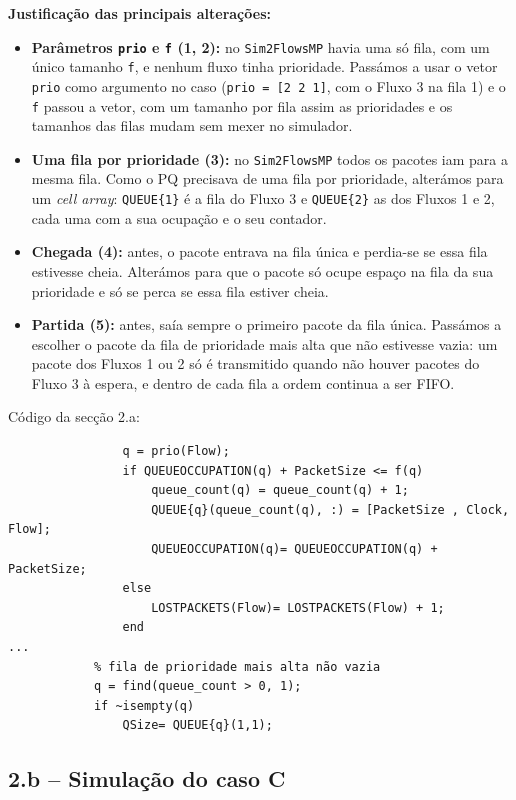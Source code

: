 \documentclass[11pt,a4paper]{article}
\newcommand{\code}[1]{\texttt{#1}}
\begin{document}
\textbf{Justificação das principais alterações:}
\begin{itemize}
  \item \textbf{Parâmetros \code{prio} e \code{f} (1, 2):} no \code{Sim2FlowsMP} havia uma só fila, com um único tamanho \code{f}, e nenhum fluxo tinha prioridade. Passámos a usar o vetor \code{prio} como argumento no caso (\code{prio = [2 2 1]}, com o Fluxo 3 na fila 1) e o \code{f} passou a vetor, com um tamanho por fila assim as prioridades e os tamanhos das filas mudam sem mexer no simulador.
  \item \textbf{Uma fila por prioridade (3):} no \code{Sim2FlowsMP} todos os pacotes iam para a mesma fila. Como o PQ precisava de uma fila por prioridade, alterámos para um \textit{cell array}: \code{QUEUE\{1\}} é a fila do Fluxo 3 e \code{QUEUE\{2\}} as dos Fluxos 1 e 2, cada uma com a sua ocupação e o seu contador.
  \item \textbf{Chegada (4):} antes, o pacote entrava na fila única e perdia-se se essa fila estivesse cheia. Alterámos para que o pacote só ocupe espaço na fila da sua prioridade e só se perca se essa fila estiver cheia.
  \item \textbf{Partida (5):} antes, saía sempre o primeiro pacote da fila única. Passámos a escolher o pacote da fila de prioridade mais alta que não estivesse vazia: um pacote dos Fluxos 1 ou 2 só é transmitido quando não houver pacotes do Fluxo 3 à espera, e dentro de cada fila a ordem continua a ser FIFO.
\end{itemize}


Código da secção 2.a:

\begin{lstlisting}[firstnumber=72]
                % fila da prioridade do pacote
                q = prio(Flow);
                if QUEUEOCCUPATION(q) + PacketSize <= f(q)
                    queue_count(q) = queue_count(q) + 1;
                    QUEUE{q}(queue_count(q), :) = [PacketSize , Clock, Flow];
                    QUEUEOCCUPATION(q)= QUEUEOCCUPATION(q) + PacketSize;
                else
                    LOSTPACKETS(Flow)= LOSTPACKETS(Flow) + 1;
                end
...
            % fila de prioridade mais alta não vazia
            q = find(queue_count > 0, 1);
            if ~isempty(q)
                QSize= QUEUE{q}(1,1);
\end{lstlisting}

\subsection{2.b -- Simulação do caso C}
\end{document}
